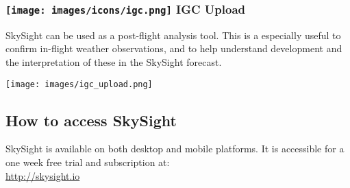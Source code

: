 \documentclass[9pt,a4paper,twocolumn]{article}
\begin{document}
\subsubsection*{\texttt{[image: images/icons/igc.png]} IGC Upload}
SkySight can be used as a post-flight analysis tool. This is a especially useful to confirm in-flight weather observations, and to help understand development and the interpretation of these in the SkySight forecast.

\texttt{[image: images/igc\_upload.png]}

\subsection*{How to access SkySight}
SkySight is available on both desktop and mobile platforms. It is accessible for a one week free trial and subscription at:\\
\url{http://skysight.io}
\end{document}
